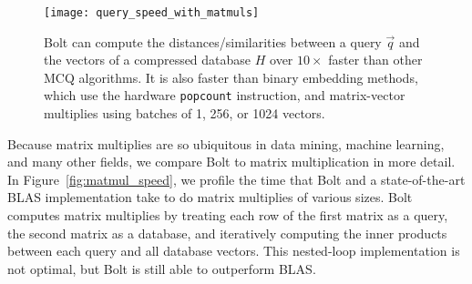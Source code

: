 

\begin{figure}[h]
\begin{center}
\texttt{[image: query\_speed\_with\_matmuls]}
\caption{Bolt can compute the distances/similarities between a query $\vec{q}$ and the vectors of a compressed database $H$ over $10\times$ faster than other MCQ algorithms. It is also faster than binary embedding methods, which use the hardware \texttt{popcount} instruction, and matrix-vector multiplies using batches of 1, 256, or 1024 vectors.}
\label{fig:query_speeds}
\end{center}
\end{figure}

Because matrix multiplies are so ubiquitous in data mining, machine learning, and many other fields, we compare Bolt to matrix multiplication in more detail. In Figure~\ref{fig:matmul_speed}, we profile the time that Bolt and a state-of-the-art BLAS implementation \cite{eigen} take to do matrix multiplies of various sizes. Bolt computes matrix multiplies by treating each row of the first matrix as a query, the second matrix as a database, and iteratively computing the inner products between each query and all database vectors. This nested-loop implementation is not optimal, but Bolt is still able to outperform BLAS.

